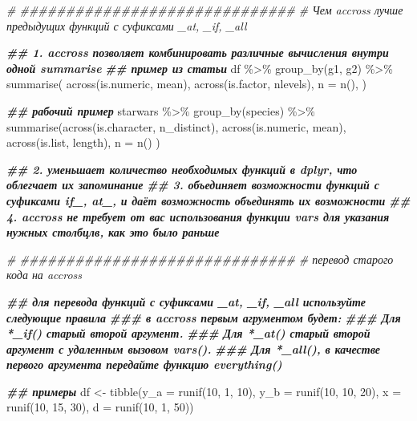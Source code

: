 \documentclass[
]{book}
\newenvironment{Shaded}{\begin{snugshade}}{\end{snugshade}}
\newcommand{\AttributeTok}[1]{\textcolor[rgb]{0.77,0.63,0.00}{#1}}
\newcommand{\CommentTok}[1]{\textcolor[rgb]{0.56,0.35,0.01}{\textit{#1}}}
\newcommand{\DecValTok}[1]{\textcolor[rgb]{0.00,0.00,0.81}{#1}}
\newcommand{\DocumentationTok}[1]{\textcolor[rgb]{0.56,0.35,0.01}{\textbf{\textit{#1}}}}
\newcommand{\FunctionTok}[1]{\textcolor[rgb]{0.00,0.00,0.00}{#1}}
\newcommand{\NormalTok}[1]{#1}
\newcommand{\OtherTok}[1]{\textcolor[rgb]{0.56,0.35,0.01}{#1}}
\newcommand{\SpecialCharTok}[1]{\textcolor[rgb]{0.00,0.00,0.00}{#1}}
\begin{document}
\begin{Shaded}
\begin{Highlighting}[]
\CommentTok{\# \#\#\#\#\#\#\#\#\#\#\#\#\#\#\#\#\#\#\#\#\#\#\#\#\#\#\#\#\#\#}
\CommentTok{\# Чем accross лучше предыдущих функций с суфиксами \_at, \_if, \_all}

\DocumentationTok{\#\# 1. accross позволяет комбинировать различные вычисления внутри одной summarise }
\DocumentationTok{\#\# пример из статьи}
\NormalTok{df }\SpecialCharTok{\%\textgreater{}\%}
  \FunctionTok{group\_by}\NormalTok{(g1, g2) }\SpecialCharTok{\%\textgreater{}\%} 
  \FunctionTok{summarise}\NormalTok{(}
    \FunctionTok{across}\NormalTok{(is.numeric, mean), }
    \FunctionTok{across}\NormalTok{(is.factor, nlevels),}
    \AttributeTok{n =} \FunctionTok{n}\NormalTok{(), }
\NormalTok{  )}

\DocumentationTok{\#\# рабочий пример}
\NormalTok{starwars }\SpecialCharTok{\%\textgreater{}\%} 
  \FunctionTok{group\_by}\NormalTok{(species) }\SpecialCharTok{\%\textgreater{}\%} 
  \FunctionTok{summarise}\NormalTok{(}\FunctionTok{across}\NormalTok{(is.character, n\_distinct), }
            \FunctionTok{across}\NormalTok{(is.numeric, mean), }
            \FunctionTok{across}\NormalTok{(is.list, length), }
            \AttributeTok{n =} \FunctionTok{n}\NormalTok{()}
\NormalTok{  )}

\DocumentationTok{\#\# 2. уменьшает количество необходимых функций в dplyr, что облегчает их запоминание}
\DocumentationTok{\#\# 3. объединяет возможности функций с суфиксами if\_, at\_, и даёт возможность объединять их возможности}
\DocumentationTok{\#\# 4. accross не требует от вас использования функции vars для указания нужных столбцлв, как это было раньше}

\CommentTok{\# \#\#\#\#\#\#\#\#\#\#\#\#\#\#\#\#\#\#\#\#\#\#\#\#\#\#\#\#\#\#}
\CommentTok{\# перевод старого кода на accross}

\DocumentationTok{\#\# для перевода функций с суфиксами \_at, \_if, \_all используйте следующие правила}
\DocumentationTok{\#\#\# в accross первым агрументом будет:}
\DocumentationTok{\#\#\# Для *\_if() старый второй аргумент.}
\DocumentationTok{\#\#\# Для *\_at() старый второй аргумент с удаленным вызовом vars().}
\DocumentationTok{\#\#\# Для *\_all(), в качестве первого аргумента передайте функцию everything()}

\DocumentationTok{\#\# примеры}
\NormalTok{df }\OtherTok{\textless{}{-}} \FunctionTok{tibble}\NormalTok{(}\AttributeTok{y\_a  =} \FunctionTok{runif}\NormalTok{(}\DecValTok{10}\NormalTok{, }\DecValTok{1}\NormalTok{, }\DecValTok{10}\NormalTok{),}
             \AttributeTok{y\_b  =} \FunctionTok{runif}\NormalTok{(}\DecValTok{10}\NormalTok{, }\DecValTok{10}\NormalTok{, }\DecValTok{20}\NormalTok{),}
             \AttributeTok{x    =} \FunctionTok{runif}\NormalTok{(}\DecValTok{10}\NormalTok{, }\DecValTok{15}\NormalTok{, }\DecValTok{30}\NormalTok{),}
             \AttributeTok{d    =} \FunctionTok{runif}\NormalTok{(}\DecValTok{10}\NormalTok{, }\DecValTok{1}\NormalTok{, }\DecValTok{50}\NormalTok{))}


\end{Highlighting}
\end{Shaded}
\end{document}
